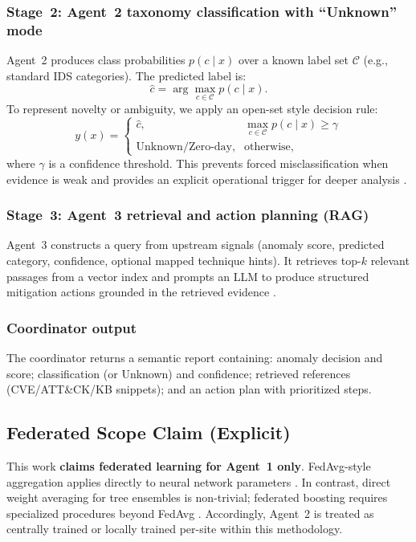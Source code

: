 \documentclass[conference]{IEEEtran}
\begin{document}
\subsubsection{Stage~2: Agent~2 taxonomy classification with ``Unknown'' mode}
Agent~2 produces class probabilities $p(c\mid x)$ over a known label set $\mathcal{C}$ (e.g., standard IDS categories). The predicted label is:
\begin{equation}
  \hat{c} = \arg\max_{c \in \mathcal{C}} p(c\mid x).
\end{equation}
To represent novelty or ambiguity, we apply an open-set style decision rule:
\begin{equation}
  y(x) =
  \begin{cases}
    \hat{c}, & \max_{c \in \mathcal{C}} p(c\mid x) \ge \gamma \\
    \text{Unknown/Zero-day}, & \text{otherwise,}
  \end{cases}
  \label{eq:unknown_rule}
\end{equation}
where $\gamma$ is a confidence threshold. This prevents forced misclassification when evidence is weak and provides an explicit operational trigger for deeper analysis \cite{scheirer2013openset,bendale2016openset}.

\subsubsection{Stage~3: Agent~3 retrieval and action planning (RAG)}
Agent~3 constructs a query from upstream signals (anomaly score, predicted category, confidence, optional mapped technique hints). It retrieves top-$k$ relevant passages from a vector index and prompts an LLM to produce structured mitigation actions grounded in the retrieved evidence \cite{lewis2020rag}.

\subsubsection{Coordinator output}
The coordinator returns a semantic report containing: anomaly decision and score; classification (or Unknown) and confidence; retrieved references (CVE/ATT\&CK/KB snippets); and an action plan with prioritized steps.

\subsection{Federated Scope Claim (Explicit)}
This work \textbf{claims federated learning for Agent~1 only}. FedAvg-style aggregation applies directly to neural network parameters \cite{mcmahan2017fedavg}. In contrast, direct weight averaging for tree ensembles is non-trivial; federated boosting requires specialized procedures beyond FedAvg \cite{kairouz2021flsurvey}. Accordingly, Agent~2 is treated as centrally trained or locally trained per-site within this methodology.
\end{document}
